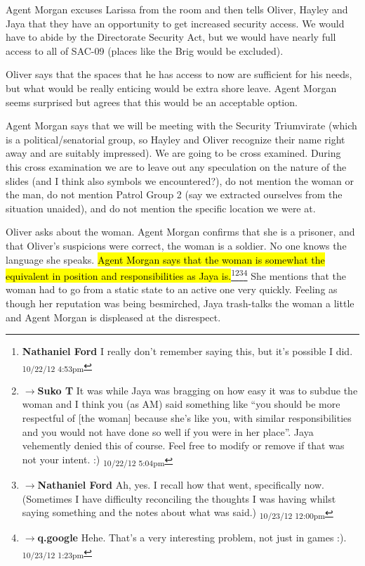 Agent Morgan excuses Larissa from the room and then tells Oliver, Hayley and Jaya that they have an opportunity to get increased security access.  We would have to abide by the Directorate Security Act, but we would have nearly full access to all of SAC-09 (places like the Brig would be excluded).  



Oliver says that the spaces that he has access to now are sufficient for his needs, but what would be really enticing would be extra shore leave.  Agent Morgan seems surprised but agrees that this would be an acceptable option.



Agent Morgan says that we will be meeting with the Security Triumvirate (which is a political/senatorial group, so Hayley and Oliver recognize their name right away and are suitably impressed).  We are going to be cross examined. During this cross examination we are to leave out any speculation on the nature of the slides (and I think also symbols we encountered?), do not mention the woman or the man, do not mention Patrol Group 2 (say we extracted ourselves from the situation unaided), and do not mention the specific location we were at.



Oliver asks about the woman.  Agent Morgan confirms that she is a prisoner, and that Oliver's suspicions were correct, the woman is a soldier.  No one knows the language she speaks.  \hl{Agent Morgan says that the woman is somewhat the equivalent in position and responsibilities as Jaya is.}\footnote{\textbf{Nathaniel Ford }I really don't remember saying this, but it's possible I did. \textsubscript{10/22/12 4:53pm}}\footnote{$\rightarrow$\textbf{Suko T }It was while Jaya was bragging on how easy it was to subdue the woman and I think you (as AM) said something like ``you should be more respectful of {[}the woman{]} because she's like you, with similar responsibilities and you would not have done so well if you were in her place''. Jaya vehemently denied this of course.  Feel free to modify or remove if that was not your intent. :) \textsubscript{10/22/12 5:04pm}}\footnote{$\rightarrow$\textbf{Nathaniel Ford }Ah, yes. I recall how that went, specifically now. (Sometimes I have difficulty reconciling the thoughts I was having whilst saying something and the notes about what was said.) \textsubscript{10/23/12 12:00pm}}\footnote{$\rightarrow$\textbf{q.google }Hehe.  That's a very interesting problem, not just in games :). \textsubscript{10/23/12 1:23pm}}  She mentions that the woman had to go from a static state to an active one very quickly.  Feeling as though her reputation was being besmirched, Jaya trash-talks the woman a little and Agent Morgan is displeased at the disrespect. 



